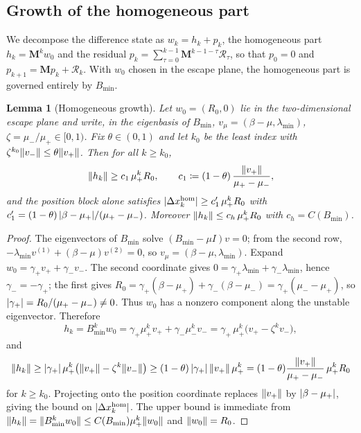 \documentclass[11pt]{article}
\theoremstyle{plain}
\newtheorem{lemma}{Lemma}[section]
\theoremstyle{definition}
\theoremstyle{remark}
\DeclarePairedDelimiter{\norm}{\lVert}{\rVert}
\DeclarePairedDelimiter{\abs}{\lvert}{\rvert}
\newcommand{\Bmin}{B_{\min}}
\newcommand{\mup}{\mu_{+}}
\newcommand{\mum}{\mu_{-}}
\newcommand{\vp}{v_{+}}
\newcommand{\vm}{v_{-}}
\newcommand{\gp}{\gamma_{+}}
\newcommand{\gm}{\gamma_{-}}
\newcommand{\Mmat}{\mathbf{M}}
\begin{document}
\subsection{Growth of the homogeneous part}

We decompose the difference state as $w_{k}=h_{k}+p_{k}$, the
homogeneous part $h_{k}=\Mmat^{k}w_{0}$ and the residual
$p_{k}=\sum_{\tau=0}^{k-1}\Mmat^{k-1-\tau}\mathcal{R}_{\tau}$, so that
$p_{0}=0$ and $p_{k+1}=\Mmat p_{k}+\mathcal{R}_{k}$. With $w_{0}$ chosen
in the escape plane, the homogeneous part is governed entirely by
$\Bmin$.

\begin{lemma}[Homogeneous growth]
\label{lem:homgrowth}
Let $w_{0}=(R_{0},0)$ lie in the two-dimensional escape plane and write,
in the eigenbasis of $\Bmin$, $v_{\mu}=(\beta-\mu,\lambda_{\min})$,
$\zeta=\mum/\mup\in[0,1)$. Fix $\theta\in(0,1)$ and let $k_{0}$ be the
least index with $\zeta^{k_{0}}\norm{\vm}\le\theta\norm{\vp}$. Then for
all $k\ge k_{0}$,
\begin{equation}\label{eq:hgrowth}
  \norm{h_{k}}\ge c_{1}\,\mup^{k}R_{0},
  \qquad c_{1}\coloneqq(1-\theta)\,\frac{\norm{\vp}}{\mup-\mum},
\end{equation}
and the position block alone satisfies
$\abs{\Delta x_{k}^{\mathrm{hom}}}\ge c_{1}'\,\mup^{k}R_{0}$ with
$c_{1}'=(1-\theta)\,\abs{\beta-\mup}/(\mup-\mum)$. Moreover
$\norm{h_{k}}\le c_{h}\,\mup^{k}R_{0}$ with $c_{h}=C(\Bmin)$.
\end{lemma}

\begin{proof}
The eigenvectors of $\Bmin$ solve $(\Bmin-\mu I)v=0$; from the second
row, $-\lambda_{\min}v^{(1)}+(\beta-\mu)v^{(2)}=0$, so
$v_{\mu}=(\beta-\mu,\lambda_{\min})$. Expand $w_{0}=\gp\vp+\gm\vm$. The
second coordinate gives $0=\gp\lambda_{\min}+\gm\lambda_{\min}$, hence
$\gm=-\gp$; the first gives
$R_{0}=\gp(\beta-\mup)+\gm(\beta-\mum)=\gp(\mum-\mup)$, so
$\abs{\gp}=R_{0}/(\mup-\mum)\neq0$. Thus $w_{0}$ has a nonzero component
along the unstable eigenvector. Therefore
\[
  h_{k}=\Bmin^{k}w_{0}
  =\gp\mup^{k}\vp+\gm\mum^{k}\vm
  =\gp\,\mup^{k}\big(\vp-\zeta^{k}\vm\big),
\]
and
\[
  \norm{h_{k}}
  \ge\abs{\gp}\,\mup^{k}\big(\norm{\vp}-\zeta^{k}\norm{\vm}\big)
  \ge(1-\theta)\,\abs{\gp}\,\norm{\vp}\,\mup^{k}
  =(1-\theta)\frac{\norm{\vp}}{\mup-\mum}\,\mup^{k}R_{0}
\]
for $k\ge k_{0}$. Projecting onto the position coordinate replaces
$\norm{\vp}$ by $\abs{\beta-\mup}$, giving the bound on
$\abs{\Delta x_{k}^{\mathrm{hom}}}$. The upper bound is immediate from
$\norm{h_{k}}=\norm{\Bmin^{k}w_{0}}\le C(\Bmin)\mup^{k}\norm{w_{0}}$
and $\norm{w_{0}}=R_{0}$.
\end{proof}
\end{document}
